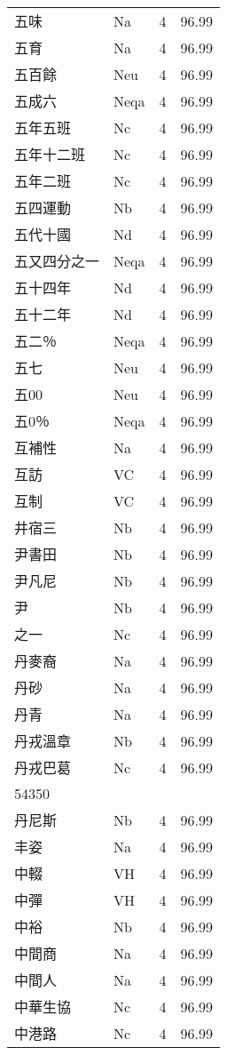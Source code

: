 \documentclass[twocolumn]{book}
\begin{document}
\begin{supertabular}{llrr}
五味 & Na & 4 &  96.99\\
五育 & Na & 4 &  96.99\\
五百餘 & Neu & 4 &  96.99\\
五成六 & Neqa & 4 &  96.99\\
五年五班 & Nc & 4 &  96.99\\
五年十二班 & Nc & 4 &  96.99\\
五年二班 & Nc & 4 &  96.99\\
五四運動 & Nb & 4 &  96.99\\
五代十國 & Nd & 4 &  96.99\\
五又四分之一 & Neqa & 4 &  96.99\\
五十四年 & Nd & 4 &  96.99\\
五十二年 & Nd & 4 &  96.99\\
五二％ & Neqa & 4 &  96.99\\
五七 & Neu & 4 &  96.99\\
五00 & Neu & 4 &  96.99\\
五0％ & Neqa & 4 &  96.99\\
互補性 & Na & 4 &  96.99\\
互訪 & VC & 4 &  96.99\\
互制 & VC & 4 &  96.99\\
井宿三 & Nb & 4 &  96.99\\
尹書田 & Nb & 4 &  96.99\\
尹凡尼 & Nb & 4 &  96.99\\
尹 & Nb & 4 &  96.99\\
之一 & Nc & 4 &  96.99\\
丹麥裔 & Na & 4 &  96.99\\
丹砂 & Na & 4 &  96.99\\
丹青 & Na & 4 &  96.99\\
丹戎溫章 & Nb & 4 &  96.99\\
丹戎巴葛 & Nc & 4 &  96.99\\
54350\\
丹尼斯 & Nb & 4 &  96.99\\
丰姿 & Na & 4 &  96.99\\
中輟 & VH & 4 &  96.99\\
中彈 & VH & 4 &  96.99\\
中裕 & Nb & 4 &  96.99\\
中間商 & Na & 4 &  96.99\\
中間人 & Na & 4 &  96.99\\
中華生協 & Nc & 4 &  96.99\\
中港路 & Nc & 4 &  96.99\\

\end{supertabular}
\end{document}
